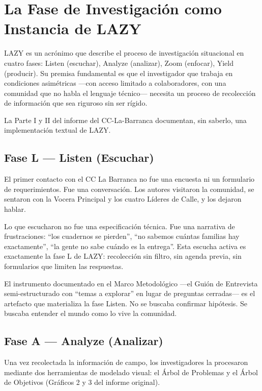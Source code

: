 \documentclass[14pt,a4paper,oneside]{extbook}
\begin{document}
\section{La Fase de Investigación como Instancia de LAZY}

LAZY es un acrónimo que describe el proceso de investigación situacional en cuatro fases: Listen (escuchar), Analyze (analizar), Zoom (enfocar), Yield (producir). Su premisa fundamental es que el investigador que trabaja en condiciones asimétricas ---con acceso limitado a colaboradores, con una comunidad que no habla el lenguaje técnico--- necesita un proceso de recolección de información que sea riguroso sin ser rígido.

La Parte I y II del informe del CC-La-Barranca documentan, sin saberlo, una implementación textual de LAZY.



\subsection{Fase L — Listen (Escuchar)}

El primer contacto con el CC La Barranca no fue una encuesta ni un formulario de requerimientos. Fue una conversación. Los autores visitaron la comunidad, se sentaron con la Vocera Principal y los cuatro Líderes de Calle, y los dejaron hablar.

Lo que escucharon no fue una especificación técnica. Fue una narrativa de frustraciones: \enquote{los cuadernos se pierden}, \enquote{no sabemos cuántas familias hay exactamente}, \enquote{la gente no sabe cuándo es la entrega}. Esta escucha activa es exactamente la fase L de LAZY: recolección sin filtro, sin agenda previa, sin formularios que limiten las respuestas.

El instrumento documentado en el Marco Metodológico ---el Guión de Entrevista semi-estructurado con \enquote{temas a explorar} en lugar de preguntas cerradas--- es el artefacto que materializa la fase Listen. No se buscaba confirmar hipótesis. Se buscaba entender el mundo como lo vive la comunidad.



\subsection{Fase A — Analyze (Analizar)}

Una vez recolectada la información de campo, los investigadores la procesaron mediante dos herramientas de modelado visual: el Árbol de Problemas y el Árbol de Objetivos (Gráficos 2 y 3 del informe original).
\end{document}
